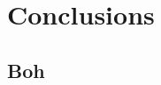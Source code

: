 \documentclass[12pt,a4paper,hidelinks]{article}
\begin{document}
\section{Conclusions}\label{sec:conclusions}

\subsection{Boh}



\end{document}
